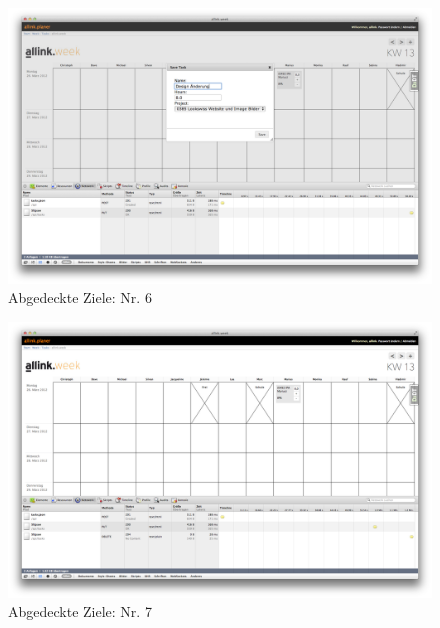 \begin{figure}[htbp]
    \centering
        \includegraphics[height=0.85\textwidth,angle=90]{bilder/testing/Task_bearbeiten.png}
    \caption{Abgedeckte Ziele: Nr. 6}
    \label{fig:bilder_testing_Task_bearbeiten}
\end{figure}
\begin{figure}[htbp]
    \centering
        \includegraphics[height=0.85\textwidth,angle=90]{bilder/testing/Task_loeschen.png}
    \caption{Abgedeckte Ziele: Nr. 7}
    \label{fig:bilder_testing_Task_loeschen}
\end{figure}
